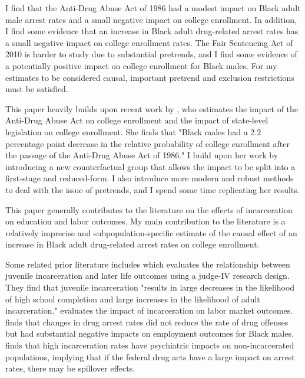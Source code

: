 \documentclass{article}
\begin{document}

I find that the Anti-Drug Abuse Act of 1986 had a modest impact on Black adult male arrest rates and a small negative impact on college enrollment. In addition, I find some evidence that an increase in Black adult drug-related arrest rates has a small negative impact on college enrollment rates. The Fair Sentencing Act of 2010 is harder to study due to substantial pretrends, and I find some evidence of a potentially positive impact on college enrollment for Black males. For my estimates to be considered causal, important pretrend and exclusion restrictions must be satisfied.

This paper heavily builds upon recent work by \cite{britton2022}, who estimates the impact of the Anti-Drug Abuse Act on college enrollment and the impact of state-level legislation on college enrollment. She finds that "Black males had a 2.2 percentage point decrease in the relative probability of college enrollment after the passage of the Anti-Drug Abuse Act of 1986." I build upon her work by introducing a new counterfactual group that allows the impact to be split into a first-stage and reduced-form. I also introduce more modern and robust methods to deal with the issue of pretrends, and I spend some time replicating her results.

This paper generally contributes to the literature on the effects of incarceration on education and labor outcomes. My main contribution to the literature is a relatively imprecise and subpopulation-specific estimate of the causal effect of an increase in Black adult drug-related arrest rates on college enrollment.

Some related prior literature includes \cite{aizer} which evaluates the relationship between juvenile incarceration and later life outcomes using a judge-IV research design. They find that juvenile incarceration "results in large decreases in the likelihood of high school completion and large increases in the likelihood of adult incarceration." \cite{western} evaluates the impact of incarceration on labor market outcomes. \cite{mitchell2016effect} finds that changes in drug arrest rates did not reduce the rate of drug offenses but had substantial negative impacts on employment outcomes for Black males. \cite{hatzenbuehler2015collateral} finds that high incarceration rates have psychiatric impacts on non-incarcerated populations, implying that if the federal drug acts have a large impact on arrest rates, there may be spillover effects.
\end{document}
